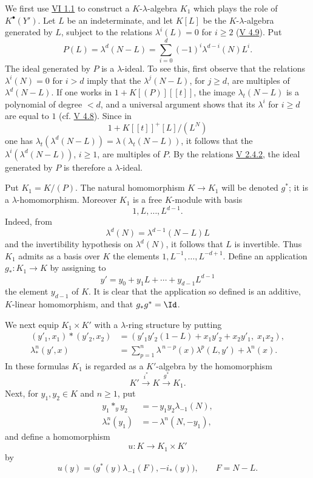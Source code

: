 We first use \hyperlink{sga6.e06.thm.1-1}{VI 1.1} to construct a \(K\)-\(\lambda\)-algebra \(K_1\) which plays the role of \(K^\bullet(Y')\). Let \(L\) be an indeterminate, and let \(K[L]\) be the \(K\)-\(\lambda\)-algebra generated by \(L\), subject to the relations \(\lambda^i(L)=0\) for \(i\ge2\) (\hyperlink{sga6.e05.cor.4-9}{V 4.9}). Put
\[
  P(L)=\lambda^d(N-L)=\sum_{i=0}^{d}(-1)^i\lambda^{d-i}(N)L^i.
\]
The ideal generated by \(P\) is a \(\lambda\)-ideal. To see this, first observe that the relations \(\lambda^i(N)=0\) for \(i>d\) imply that the \(\lambda^j(N-L)\), for \(j\ge d\), are multiples of \(\lambda^d(N-L)\). If one works in \(1+K[(P)][[t]]\), the image \(\lambda_t(N-L)\) is a polynomial of degree \(<d\), and a universal argument shows that its \(\lambda^i\) for \(i\ge d\) are equal to \(1\) (cf. \hyperlink{sga6.e05.prop.4-8}{V 4.8}). Since in
\[
1+K[[t]]^+[L]/(L^N)
\]
one has \(\lambda_t(\lambda^d(N-L))=\lambda(\lambda_t(N-L))\), it follows that the \(\lambda^i(\lambda^d(N-L))\), \(i\ge1\), are multiples of \(P\). By the relations \hyperlink{sga6.e05.eq.2-4-2}{V 2.4.2}, the ideal generated by \(P\) is therefore a \(\lambda\)-ideal.

Put \(K_1=K/(P)\). The natural homomorphism \(K\to K_1\) will be denoted \(g^*\); it is a \(\lambda\)-homomorphism. Moreover \(K_1\) is a free \(K\)-module with basis
\[
  1,L,\ldots,L^{d-1}.
\]
Indeed, from
\[
  \lambda^d(N)=\lambda^{d-1}(N-L)L
\]
and the invertibility hypothesis on \(\lambda^d(N)\), it follows that \(L\) is invertible. Thus \(K_1\) admits as a basis over \(K\) the elements \(1,L^{-1},\ldots,L^{-d+1}\). Define an application \(g_*:K_1\to K\) by assigning to
\[
y'=y_0+y_1L+\cdots+y_{d-1}L^{d-1}
\]
the element \(y_{d-1}\) of \(K\). It is clear that the application so defined is an additive, \(K\)-linear homomorphism, and that \(g_*g^*=\Id\).

We next equip \(K_1\times K'\) with a \(\lambda\)-ring structure by putting
\begin{align}
 (y'_1,x_1)*(y'_2,x_2)
   &=(y'_1y'_2(1-L)+x_1y'_2+x_2y'_1,\; x_1x_2), \tag{4.7.1}\\
 \lambda^n_*(y',x)
   &=\sum_{p=1}^{n}\lambda^{\,n-p}(x)\lambda^p(L,y')
     +\lambda^n(x). \tag{4.7.2}
\end{align}
In these formulas \(K_1\) is regarded as a \(K'\)-algebra by the homomorphism
\[
  K'\xrightarrow{i^*}K\xrightarrow{g^*}K_1.
\]
Next, for \(y_1,y_2\in K\) and \(n\ge1\), put
\begin{align}
 y_1*_y y_2&=-\,y_1y_2\lambda_{-1}(N), \tag{4.7.3}\\
 \lambda^n_*(y_1)&=-\,\lambda^n(N,-y_1), \tag{4.7.4}
\end{align}
and define a homomorphism
\[
  u:K\longrightarrow K_1\times K'
\]
by
\[
  u(y)=\bigl(g^*(y)\lambda_{-1}(F),-i_*(y)\bigr),
  \qquad F=N-L.
\]


